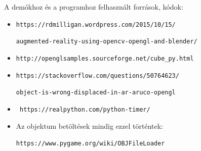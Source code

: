 A demókhoz és a programhoz felhasznált források, kódok:

\begin{itemize}
\item \texttt{https://rdmilligan.wordpress.com/2015/10/15/}

\texttt{augmented-reality-using-opencv-opengl-and-blender/}

\item \texttt{http://openglsamples.sourceforge.net/cube\_py.html }

\item \texttt{https://stackoverflow.com/questions/50764623/}


\texttt{object-is-wrong-displaced-in-ar-aruco-opengl}

\item \texttt{ https://realpython.com/python-timer/}

\item  Az objektum betöltések mindig ezzel történtek:

\texttt{https://www.pygame.org/wiki/OBJFileLoader} 



\end{itemize}

